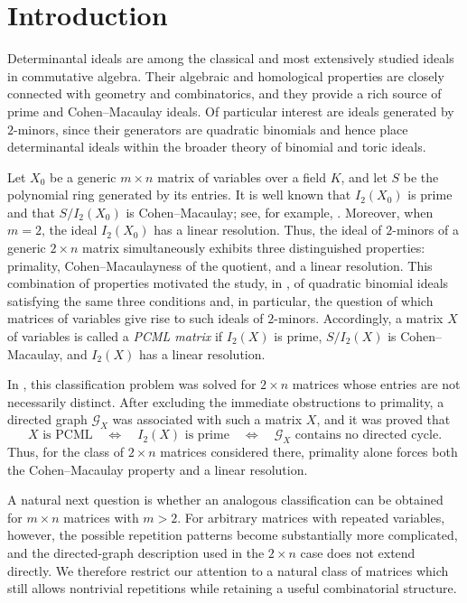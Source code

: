 \documentclass[12pt]{amsart}
\numberwithin{equation}{section}
\begin{document}
\section*{Introduction}
Determinantal ideals are among the classical and most extensively
studied ideals in commutative algebra. Their algebraic and homological
properties are closely connected with geometry and combinatorics, and
they provide a rich source of prime and Cohen--Macaulay ideals. Of
particular interest are ideals generated by $2$-minors, since their
generators are quadratic binomials and hence place determinantal ideals
within the broader theory of binomial and toric ideals.

Let $X_0$ be a generic $m\times n$ matrix of variables over a field
$K$, and let $S$ be the polynomial ring generated by its entries. It is
well known that $I_2(X_0)$ is prime and that $S/I_2(X_0)$ is
Cohen--Macaulay; see, for example, \cite{BrunsVetter}. Moreover, when
$m=2$, the ideal $I_2(X_0)$ has a linear resolution. Thus, the ideal of
$2$-minors of a generic $2\times n$ matrix simultaneously exhibits
three distinguished properties: primality, Cohen--Macaulayness of the
quotient, and a linear resolution. This combination of properties motivated the study, in \cite{HQS}, of quadratic binomial ideals satisfying the same three conditions and, in particular, the question of which matrices of variables give rise to such ideals of $2$-minors.
Accordingly, a matrix $X$ of variables is called a \emph{PCML matrix} if
$I_2(X)$ is prime, $S/I_2(X)$ is Cohen--Macaulay, and $I_2(X)$ has a
linear resolution.

In \cite{HQ}, this classification problem was solved for
$2\times n$ matrices whose entries are not necessarily distinct.
After excluding the immediate obstructions to primality, a directed
graph $\mathcal G_X$ was associated with such a matrix $X$, and it was
proved that
\[
X\text{ is PCML}
\quad\Longleftrightarrow\quad
I_2(X)\text{ is prime}
\quad\Longleftrightarrow\quad
\mathcal G_X\text{ contains no directed cycle}.
\]
Thus, for the class of $2\times n$ matrices considered there,
primality alone forces both the Cohen--Macaulay property and a linear
resolution.

A natural next question is whether an analogous classification can be
obtained for $m\times n$ matrices with $m>2$. For arbitrary matrices
with repeated variables, however, the possible repetition patterns
become substantially more complicated, and the directed-graph
description used in the $2\times n$ case does not extend directly.
We therefore restrict our attention to a natural class of matrices
which still allows nontrivial repetitions while retaining a useful
combinatorial structure.
\end{document}
